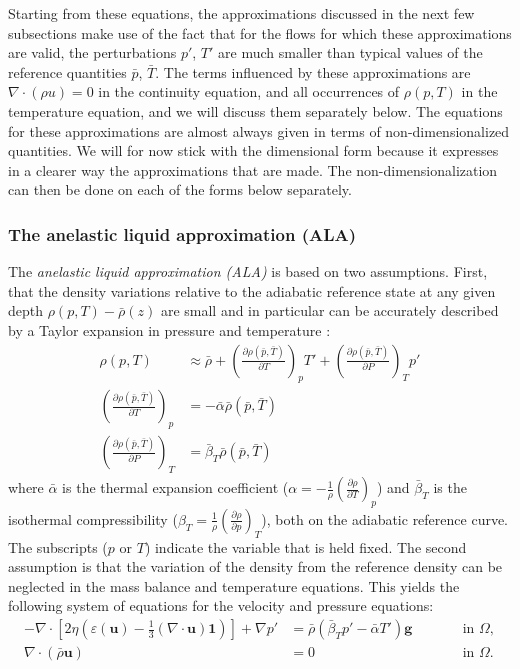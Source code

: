 \documentclass{article}
\begin{document}
Starting from these equations, the approximations discussed in the next few
subsections make use of the fact that for the flows for which these approximations are valid, the
perturbations $p'$, $T'$ are much smaller than typical values of the reference
quantities $\bar p$, $\bar T$.
The terms influenced by these approximations are $\nabla \cdot (\rho u) =0$ in the
continuity equation, and all occurrences of $\rho(p,T)$ in the temperature equation,
and we will discuss them separately below. The equations for these approximations are
almost always given in terms of non-dimensionalized quantities. We will for
now stick with the dimensional form because it expresses in a clearer way the
approximations that are made. The non-dimensionalization can then be done on
each of the forms below separately.

\subsubsection{The anelastic liquid approximation (ALA)}
\label{sec:ala}

The \textit{anelastic liquid approximation (ALA)} is based on two assumptions.
First, that the density variations relative to the adiabatic reference state at
any given depth $\rho(p,T)-\bar\rho (z)$ are small and in particular can be
accurately described by a Taylor expansion in pressure and temperature \cite{STO01}:
\begin{align}
  \rho(p,T) &\approx
  \bar\rho
  + \left( \frac{\partial \rho(\bar p,\bar T)}{\partial T} \right)_{p} T'
  + \left( \frac{\partial \rho(\bar p,\bar T)}{\partial P} \right)_{T} p' \\
  \left( \frac{\partial \rho(\bar p,\bar T)}{\partial T} \right)_{p} &= -\bar \alpha \bar \rho(\bar p,\bar T) \\
  \left( \frac{\partial \rho(\bar p,\bar T)}{\partial P} \right)_{T} &= \bar \beta_T \bar \rho(\bar p,\bar T)
\end{align}
where $\bar \alpha$ is the thermal expansion coefficient
($\alpha = -\frac{1}{\rho}\left(\frac{\partial \rho}{\partial T}\right)_p$) and $\bar \beta_T$ is
the isothermal compressibility
($\beta_T = \frac{1}{\rho}\left(\frac{\partial \rho}{\partial p}\right)_T$),
both on the adiabatic reference curve. The
subscripts ($p$ or $T$) indicate the variable that is held fixed.
The second assumption is that the variation of the density from the reference
density can be neglected in the mass balance and temperature equations.
This yields the following system of equations for the velocity and pressure
equations:
\begin{align}
  \label{eq:stokes-ALA-1}
  -\nabla \cdot \left[2\eta \left(\varepsilon(\mathbf u)
                                  - \frac{1}{3}(\nabla \cdot \mathbf u)\mathbf 1\right)
                \right] + \nabla p' &=
  \bar \rho \left(\bar \beta_T p' - \bar \alpha T' \right) \mathbf g
  & \qquad
  & \textrm{in $\Omega$},
  \\
  \label{eq:stokes-ALA-2}
  \nabla \cdot (\bar\rho \mathbf u) &= 0
  & \qquad
  & \textrm{in $\Omega$}.
\end{align}
\end{document}
